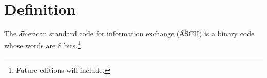 

\section*{Definition}

The \t{american standard code for information exchange} (\t{ASCII}) is a binary code whose words are 8 bits.\footnote{Future editions will include.}

\blankpage